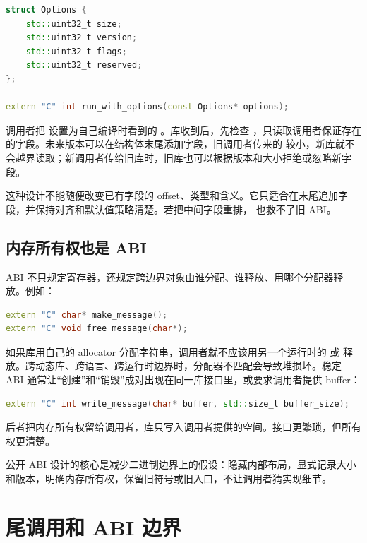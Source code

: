 \begin{lstlisting}[language=C++]
struct Options {
    std::uint32_t size;
    std::uint32_t version;
    std::uint32_t flags;
    std::uint32_t reserved;
};

extern "C" int run_with_options(const Options* options);
\end{lstlisting}

调用者把  设置为自己编译时看到的 。库收到后，先检查 ，只读取调用者保证存在的字段。未来版本可以在结构体末尾添加字段，旧调用者传来的  较小，新库就不会越界读取；新调用者传给旧库时，旧库也可以根据版本和大小拒绝或忽略新字段。

这种设计不能随便改变已有字段的 offset、类型和含义。它只适合在末尾追加字段，并保持对齐和默认值策略清楚。若把中间字段重排， 也救不了旧 ABI。

\subsection{内存所有权也是 ABI}

ABI 不只规定寄存器，还规定跨边界对象由谁分配、谁释放、用哪个分配器释放。例如：

\begin{lstlisting}[language=C++]
extern "C" char* make_message();
extern "C" void free_message(char*);
\end{lstlisting}

如果库用自己的 allocator 分配字符串，调用者就不应该用另一个运行时的  或  释放。跨动态库、跨语言、跨运行时边界时，分配器不匹配会导致堆损坏。稳定 ABI 通常让“创建”和“销毁”成对出现在同一库接口里，或要求调用者提供 buffer：

\begin{lstlisting}[language=C++]
extern "C" int write_message(char* buffer, std::size_t buffer_size);
\end{lstlisting}

后者把内存所有权留给调用者，库只写入调用者提供的空间。接口更繁琐，但所有权更清楚。

\begin{keyidea}
公开 ABI 设计的核心是减少二进制边界上的假设：隐藏内部布局，显式记录大小和版本，明确内存所有权，保留旧符号或旧入口，不让调用者猜实现细节。
\end{keyidea}

\section{尾调用和 ABI 边界}

